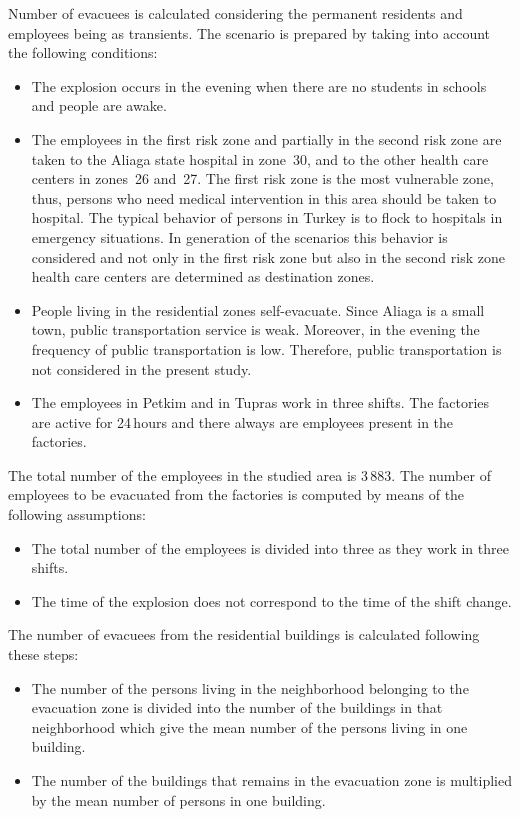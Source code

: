 Number of evacuees is calculated considering the permanent residents and employees being as transients. The scenario is prepared by taking into account the following conditions:
%
\begin{itemize}\styleItemize
\item The explosion occurs in the evening when there are no students in schools and people are awake.
%
\item The employees in the first risk zone and partially in the second risk zone are taken to the Aliaga state hospital in zone~30, and to the other health care centers in zones~26 and~27. The first risk zone is the most vulnerable zone, thus, persons who need medical intervention in this area should be taken to hospital. The typical behavior of persons in Turkey is to flock to hospitals in emergency situations. In generation of the scenarios this behavior is considered and not only in the first risk zone but also in the second risk zone health care centers are determined as destination zones.
%
\item People living in the residential zones self-evacuate. Since Aliaga is a small town, public transportation service is weak. Moreover, in the evening the frequency of public transportation is low. Therefore, public transportation is not considered in the present study.
%
\item The employees in Petkim and in Tupras work in three shifts. The factories are active for 24\,hours and there always are employees present in the factories.
\end{itemize}

The total number of the employees in the studied area is 3\,883. The number of employees to be evacuated from the factories is computed by means of the following assumptions:
%
\begin{itemize}\styleItemize
\item The total number of the employees is divided into three as they work in three shifts.
%
\item The time of the explosion does not correspond to the time of the shift change.
\end{itemize}

The number of evacuees from the residential buildings is calculated following these steps:
%
\begin{itemize}\styleItemize
\item The number of the persons living in the neighborhood belonging to the evacuation zone is divided into the number of the buildings in that neighborhood which give the mean number of the persons living in one building.
%
\item The number of the buildings that remains in the evacuation zone is multiplied by the mean number of persons in one building.
\end{itemize}

